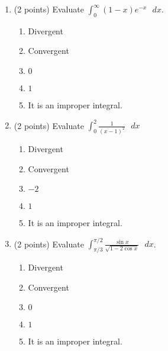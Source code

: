 \documentclass[paper=a4, fontsize=11pt]{scrartcl} %
\numberwithin{equation}{section} %
\numberwithin{figure}{section} %
\numberwithin{table}{section} %
\begin{document}
\begin{enumerate}
\item (2 points) Evaluate \large$\int_0^{\infty}(1-x)e^{-x}\text{  }dx$.
\vspace{2mm}
 \normalsize \begin{enumerate}
    \item Divergent
    \item Convergent
    \item $0$
    \item $1$
    \item It is an improper integral.
  \end{enumerate}
  \vspace{1in}
\item (2 points) Evaluate \large $\int_0^2\frac{1}{(x-1)^2}\text{  }dx$
\normalsize \begin{enumerate}
    \item Divergent
    \item Convergent
    \item $-2$
    \item $1$
    \item It is an improper integral.
  \end{enumerate}
  \vspace{1in}
\item (2 points) Evaluate \large$\int_{\pi/3}^{\pi/2}\frac{\sin x}{\sqrt{1-2\cos x}}\text{  }dx$.
  \vspace{2mm}
   \normalsize \begin{enumerate}
      \item Divergent
      \item Convergent
      \item $0$
      \item $1$
      \item It is an improper integral.
      \end{enumerate}
\end{enumerate}



\end{document}
